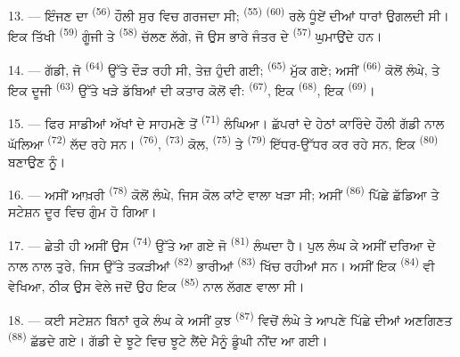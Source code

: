 13. --- ਇੰਜਣ ਦਾ  \textsuperscript{(56)} ਹੌਲੀ ਸੁਰ ਵਿਚ ਗਰਜਦਾ ਸੀ;
 \textsuperscript{(55)}  \textsuperscript{(60)} ਰਲੇ ਧੂੰਏਂ
ਦੀਆਂ ਧਾਰਾਂ ਉਗਲਦੀ ਸੀ। ਇਕ ਤਿੱਖੀ  \textsuperscript{(59)} ਗੂੰਜੀ ਤੇ
 \textsuperscript{(58)} ਚੱਲਣ ਲੱਗੇ, ਜੋ ਉਸ ਭਾਰੇ ਜੰਤਰ ਦੇ 
\textsuperscript{(57)} ਘੁਮਾਉਂਦੇ ਹਨ।

\VUsaut{3.0mm}
\VUsaut{3.0mm}

14. --- ਗੱਡੀ, ਜੋ  \textsuperscript{(64)} ਉੱਤੇ ਦੌੜ ਰਹੀ ਸੀ, ਤੇਜ਼ ਹੁੰਦੀ
ਗਈ;  \textsuperscript{(65)} ਮੁੱਕ ਗਏ; ਅਸੀਂ 
\textsuperscript{(66)} ਕੋਲੋਂ ਲੰਘੇ, ਤੇ ਇਕ ਦੂਜੀ  \textsuperscript{(63)}
ਉੱਤੇ ਖੜੇ ਡੱਬਿਆਂ ਦੀ ਕਤਾਰ ਕੋਲੋਂ ਵੀ:  \textsuperscript{(67)},
ਇਕ  \textsuperscript{(68)}, ਇਕ 
\textsuperscript{(69)}।


15. --- ਫਿਰ ਸਾਡੀਆਂ ਅੱਖਾਂ ਦੇ ਸਾਹਮਣੇ ਤੋਂ 
\textsuperscript{(71)} ਲੰਘਿਆ। ਛੱਪਰਾਂ ਦੇ ਹੇਠਾਂ ਕਾਰਿੰਦੇ ਹੌਲੀ ਗੱਡੀ ਨਾਲ ਘੱਲਿਆ
 \textsuperscript{(72)} ਲੱਦ ਰਹੇ ਸਨ। 
\textsuperscript{(76)},  \textsuperscript{(73)} ਕੋਲ,
 \textsuperscript{(75)} ਤੇ 
\textsuperscript{(79)} ਇੱਧਰ-ਉੱਧਰ ਕਰ ਰਹੇ ਸਨ, ਇਕ 
\textsuperscript{(80)} ਬਣਾਉਣ ਨੂੰ।

16. --- ਅਸੀਂ ਆਖ਼ਰੀ  \textsuperscript{(78)} ਕੋਲੋਂ ਲੰਘੇ, ਜਿਸ ਕੋਲ ਕਾਂਟੇ
ਵਾਲਾ ਖੜਾ ਸੀ; ਅਸੀਂ  \textsuperscript{(86)} ਪਿੱਛੇ ਛੱਡਿਆ ਤੇ
ਸਟੇਸ਼ਨ ਦੂਰ ਵਿਚ ਗੁੰਮ ਹੋ ਗਿਆ।

17. --- ਛੇਤੀ ਹੀ ਅਸੀਂ ਉਸ  \textsuperscript{(74)} ਉੱਤੇ ਆ ਗਏ ਜੋ
 \textsuperscript{(81)} ਲੰਘਦਾ ਹੈ। ਪੁਲ ਲੰਘ ਕੇ ਅਸੀਂ ਦਰਿਆ ਦੇ ਨਾਲ ਨਾਲ ਤੁਰੇ,
ਜਿਸ ਉੱਤੇ ਤਕੜੀਆਂ  \textsuperscript{(82)} ਭਾਰੀਆਂ
 \textsuperscript{(83)} ਖਿੱਚ ਰਹੀਆਂ ਸਨ। ਅਸੀਂ ਇਕ
 \textsuperscript{(84)} ਵੀ ਵੇਖਿਆ, ਠੀਕ ਉਸ ਵੇਲੇ ਜਦੋਂ ਉਹ ਇਕ
 \textsuperscript{(85)} ਨਾਲ ਲੱਗਣ ਵਾਲਾ ਸੀ।

18. --- ਕਈ ਸਟੇਸ਼ਨ ਬਿਨਾਂ ਰੁਕੇ ਲੰਘ ਕੇ ਅਸੀਂ ਕੁਝ 
\textsuperscript{(87)} ਵਿਚੋਂ ਲੰਘੇ ਤੇ ਆਪਣੇ ਪਿੱਛੇ  ਦੀਆਂ
ਅਣਗਿਣਤ  \textsuperscript{(88)} ਛੱਡਦੇ ਗਏ। ਗੱਡੀ ਦੇ ਝੂਟੇ ਵਿਚ ਝੂਟੇ
ਲੈਂਦੇ ਮੈਨੂੰ ਡੂੰਘੀ ਨੀਂਦ ਆ ਗਈ।

